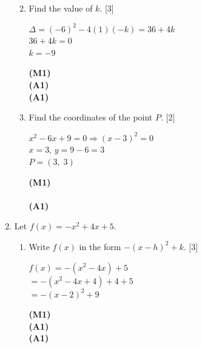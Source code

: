 \documentclass[12pt, twoside]{article}
\begin{document}
\begin{enumerate}[itemsep=0.2cm]
\begin{enumerate}[itemsep=0.3cm]
  \medskip
  \item Find the value of $k$. \hfill [3]

  \begin{minipage}[t]{0.62\textwidth}
  $\Delta = (-6)^2 - 4(1)(-k) = 36 + 4k$\\[0.15cm]
  $36 + 4k = 0$\\[0.15cm]
  $k = -9$
  \end{minipage}%
  \begin{minipage}[t]{0.35\textwidth}\raggedleft
  \textbf{(M1)}\\[0.15cm]
  \textbf{(A1)}\\[0.15cm]
  \textbf{(A1)}
  \end{minipage}

  \medskip
  \item Find the coordinates of the point $P$. \hfill [2]

  \begin{minipage}[t]{0.62\textwidth}
  $x^2 - 6x + 9 = 0 \Rightarrow (x - 3)^2 = 0$\\[0.15cm]
  $x = 3$, \quad $y = 9 - 6 = 3$\\[0.15cm]
  $P = (3,\; 3)$
  \end{minipage}%
  \begin{minipage}[t]{0.35\textwidth}\raggedleft
  \textbf{(M1)}\\[0.15cm]
  ~\\[0.15cm]
  \textbf{(A1)}
  \end{minipage}
\end{enumerate}

\newpage

\item Let $f(x) = -x^2 + 4x + 5$.

\begin{enumerate}[itemsep=0.3cm]
  \item Write $f(x)$ in the form $-(x - h)^2 + k$. \hfill [3]

  \begin{minipage}[t]{0.62\textwidth}
  $f(x) = -(x^2 - 4x) + 5$\\[0.15cm]
  $= -(x^2 - 4x + 4) + 4 + 5$\\[0.15cm]
  $= -(x - 2)^2 + 9$
  \end{minipage}%
  \begin{minipage}[t]{0.35\textwidth}\raggedleft
  \textbf{(M1)}\\[0.15cm]
  \textbf{(A1)}\\[0.15cm]
  \textbf{(A1)}
  \end{minipage}


\end{enumerate}
\end{enumerate}
\end{document}
